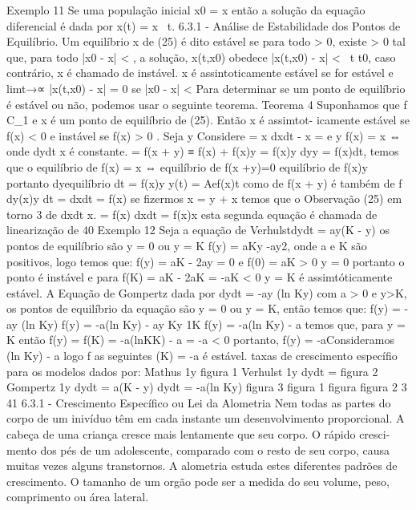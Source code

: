{{{{{{{{{{{{{Exemplo 11 Se uma população inicial x0 = x então a solução da equação diferencial é dada por x(t) = x \forall\ t. 
6.3.1 - Análise de Estabilidade dos Pontos de Equilíbrio. 
Um equilíbrio x de (25) é dito estável se para todo \epsilon > 0, existe \delta  > 0 tal que, para todo |x0 - x| < \delta , a solução, x(t,x0) obedece |x(t,x0) - x| < \epsilon\forall\ t \ge t0, caso contrário, x é chamado de instável. 
x é assintoticamente estável se for estável e limt→∝ |x(t,x0) - x| = 0 se |x0 - x| < \gamma  
Para determinar se um ponto de equilíbrio é estável ou não, podemos usar o seguinte teorema. 
Teorema 4 Suponhamos que f \in C_1 e x é um ponto de equilíbrio de (25). Então x é assimtot- icamente estável se f(x) < 0 e instável se f(x) > 0 . 
Seja y Considere = x dxdt - x = e y f(x) = x ⇔ onde dydt x é constante. 
= f(x + y) ≡ f(x) + f(x)y = f(x)y \Rightarrow  dyy = f(x)dt, temos que o equilíbrio de f(x) = x ⇔ equilíbrio de f(x +y)=0 \Rightarrow  equilíbrio de f(x)y portanto dyequilíbrio dt = f(x)y \Rightarrow  y(t) = Aef(x)t como de f(x + y) é também de f dy(x)y dt = dxdt = f(x) se fizermos x = y + x temos que o 
Observação (25) em torno 3 de dxdt x. 
= f(x) \Rightarrow  dxdt = f(x)x esta segunda equação é chamada de linearização de 
40 
Exemplo 12 Seja a equação de Verhulstdydt = ay(K - y) 
os pontos de equilíbrio são y = 0 ou y = K \Rightarrow  f(y) = aKy -ay2, onde a e K são positivos, logo temos que: 
f(y) = aK - 2ay = 0 e f(0) = aK > 0 \Rightarrow  y = 0 portanto o ponto é instável e para f(K) = aK - 2aK = -aK < 0 \Rightarrow  y = K é assimtóticamente estável. 
A Equação de Gompertz dada por 
dydt = -ay 
(ln Ky) com a > 0 e y>K, os pontos de equilíbrio da equação são y = 0 ou y = K, então temos que: 
f(y) = -ay 
(ln Ky) f(y) = -a(ln Ky) 
- ay Ky 
1K f(y) = -a(ln Ky) 
- a temos que, para y = K então f(y) = f(K) = -a(lnKK) 
- a = -a < 0 portanto, f(y) = -aConsideramos (ln Ky) 
- a logo f as seguintes (K) = -a é estável. 
taxas de crescimento específio para os modelos dados por: Mathus 1y 
figura 1 
Verhulst 1y 
dydt = \gamma  
figura 2 
Gompertz 1y 
dydt = a(K - y) 
dydt = -a(ln Ky) 
figura 3 
figura 1 
figura figura 2 
3 
41 
6.3.1 - Crescimento Específico ou Lei da Alometria 
Nem todas as partes do corpo de um inivíduo têm em cada instante um desenvolvimento proporcional. A cabeça de uma criança cresce mais lentamente que seu corpo. O rápido cresci- mento dos pés de um adolescente, comparado com o resto de seu corpo, causa muitas vezes alguns transtornos. A alometria estuda estes diferentes padrões de crescimento. O tamanho de um orgão pode ser a medida do seu volume, peso, comprimento ou área lateral. 
}}}}}}}}}}}}}
